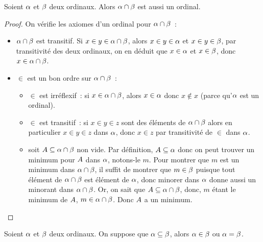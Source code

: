 \begin{proposition}
  Soient $\alpha$ et $\beta$ deux ordinaux. Alors $\alpha\cap \beta$ est aussi
  un ordinal.
\end{proposition}

\begin{proof}
  On vérifie les axiomes d'un ordinal pour $\alpha\cap\beta$~:
  \begin{itemize}
  \item $\alpha \cap \beta$ est transitif. Si $x\in y \in \alpha \cap \beta$,
    alors $x\in y\in \alpha$ et $x\in y \in\beta$, par transitivité des deux
    ordinaux, on en déduit que $x\in \alpha$ et $x\in \beta$, donc
    $x\in\alpha\cap\beta$.
  \item $\in$ est un bon ordre sur $\alpha\cap\beta$~:
    \begin{itemize}
    \item $\in$ est irréflexif~: si $x \in \alpha\cap\beta$, alors
      $x\in \alpha$ donc $x\notin x$ (parce qu'$\alpha$ est un ordinal).
    \item $\in$ est transitif~: si $x\in y\in z$ sont des éléments de
      $\alpha\cap\beta$ alors en particulier $x\in y \in z$ dans $\alpha$, donc
      $x\in z$ par transitivité de $\in$ dans $\alpha$.
    \item soit $A\subseteq \alpha\cap \beta$ non vide. Par définition,
      $A\subseteq \alpha$ donc on peut trouver un minimum pour $A$
      dans $\alpha$, notons-le $m$. Pour montrer que $m$ est un minimum dans
      $\alpha\cap \beta$, il suffit de montrer que $m \in \beta$ puisque tout
      élément de $\alpha\cap \beta$ est élément de $\alpha$, donc minorer dans
      $\alpha$ donne aussi un minorant dans $\alpha\cap\beta$. Or, on sait que
      $A\subseteq \alpha\cap\beta$, donc, $m$ étant le minimum de
      $A$, $m\in \alpha\cap\beta$. Donc $A$ a un minimum. \qedhere
    \end{itemize}
  \end{itemize}
\end{proof}

\begin{proposition}\label{prop.carac.subset.ord}
  Soient $\alpha$ et $\beta$ deux ordinaux. On suppose que
  $\alpha \subseteq \beta$, alors $\alpha \in \beta$ ou $\alpha = \beta$.
\end{proposition}

